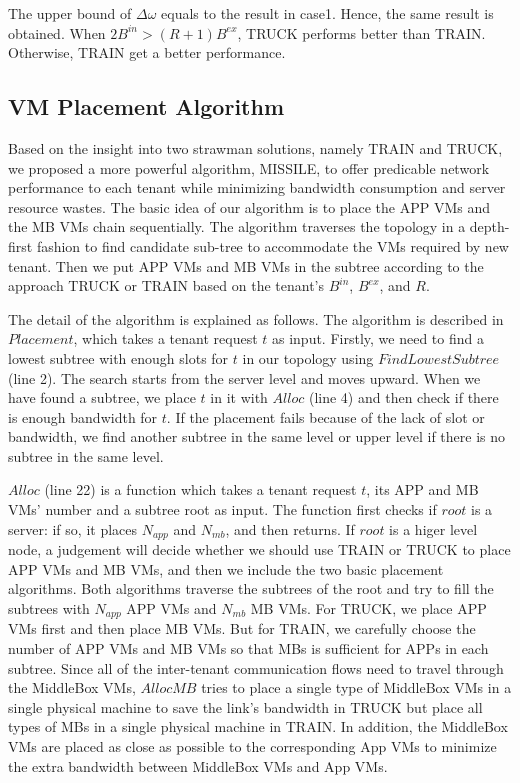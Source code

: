\documentclass[10pt, conference, letterpaper]{IEEEtran}
\begin{document}
The upper bound of $\Delta \omega$ equals to the result in case1. Hence, the same result is obtained. When $2B^{in} > (R+1)B^{ex}$, TRUCK performs better than TRAIN. Otherwise, TRAIN get a better performance.

\subsection{VM Placement Algorithm}
Based on the insight into two strawman solutions, namely TRAIN and TRUCK, we proposed a more powerful algorithm, MISSILE, to offer predicable network performance to each tenant while minimizing bandwidth consumption and server resource wastes. The basic idea of our algorithm is to place the APP VMs and the MB VMs chain sequentially. The algorithm traverses the topology in a depth-first fashion to find candidate sub-tree to accommodate the VMs required by new tenant. Then we put APP VMs and MB VMs in the subtree according to the approach TRUCK or TRAIN based on the tenant's $B^{in}$, $B^{ex}$, and $R$. 

The detail of the algorithm is explained as follows. The algorithm is described in $Placement$, which takes a tenant request $t$ as input. Firstly, we need to find a lowest subtree with enough slots for $t$ in our topology using $FindLowestSubtree$ (line 2). The search starts from the server level and moves upward. When we have found a subtree, we place $t$ in it with $Alloc$ (line 4) and then check if there is enough bandwidth for $t$. If the placement fails because of the lack of slot or bandwidth, we find another subtree in the same level or upper level if there is no subtree in the same level.

$Alloc$ (line 22) is a function which takes a tenant request $t$, its APP and MB VMs' number and a subtree root as input. The function first checks if $root$ is a server: if so, it places $N_{app}$ and $N_{mb}$, and then returns. If $root$ is a higer level node, a judgement will decide whether we should use TRAIN or TRUCK to place APP VMs and MB VMs, and then we include the two basic placement algorithms. Both algorithms traverse the subtrees of the root and try to fill the subtrees with $N_{app}$ APP VMs and $N_{mb}$ MB VMs. For TRUCK, we place APP VMs first and then place MB VMs. But for TRAIN, we carefully choose the number of APP VMs and MB VMs so that MBs is sufficient for APPs in each subtree. Since all of the inter-tenant communication flows need to travel through the MiddleBox VMs, $AllocMB$ tries to place  a single type of MiddleBox VMs in a single physical machine to save the link's bandwidth in TRUCK but place all types of MBs in a single physical machine in TRAIN. In addition, the MiddleBox VMs are placed as close as possible to the corresponding App VMs to minimize the extra bandwidth between MiddleBox VMs and App VMs.
\end{document}

